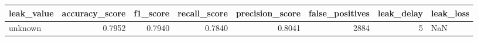 \begin{tabular}{lrrrrrrl}
\toprule
leak\_value & accuracy\_score & f1\_score & recall\_score & precision\_score & false\_positives & leak\_delay & leak\_loss \\
\midrule
unknown & 0.7952 & 0.7940 & 0.7840 & 0.8041 & 2884 & 5 & NaN \\
\bottomrule
\end{tabular}
